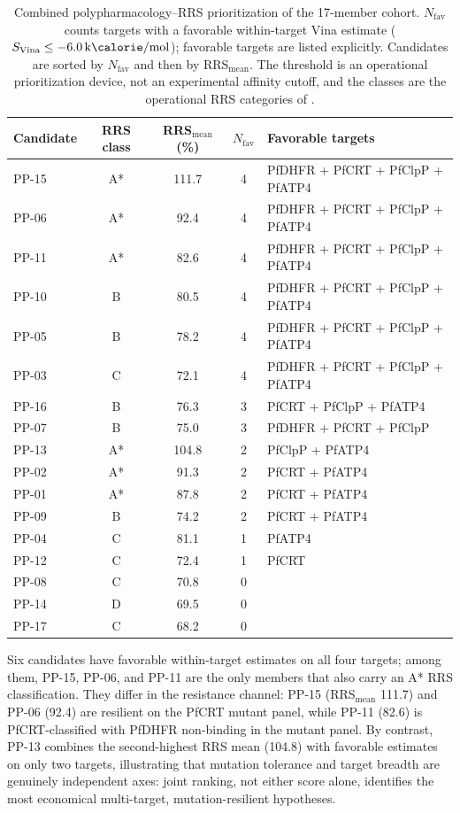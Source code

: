 \documentclass[journal=jcisd8,manuscript=article]{achemso}
\begin{document}
\begin{table}[htbp]
\centering
\caption{Combined polypharmacology--RRS prioritization of the 17-member cohort. $N_{\mathrm{fav}}$ counts targets with a favorable within-target Vina estimate ($S_{\mathrm{Vina}}\leq\qty{-6.0}{\kilo\calorie\per\mole}$); favorable targets are listed explicitly. Candidates are sorted by $N_{\mathrm{fav}}$ and then by RRS$_{\mathrm{mean}}$. The threshold is an operational prioritization device, not an experimental affinity cutoff, and the classes are the operational RRS categories of .}
\label{tab:dual_priority}
\small
\begin{tabular}{@{}lcccl@{}}
\toprule
Candidate & RRS class & RRS$_{\mathrm{mean}}$ (\%) & $N_{\mathrm{fav}}$ & Favorable targets \\
\midrule
PP-15 & A* & \num{111.7} & 4 & PfDHFR + PfCRT + PfClpP + PfATP4 \\
PP-06 & A* & \num{92.4} & 4 & PfDHFR + PfCRT + PfClpP + PfATP4 \\
PP-11 & A* & \num{82.6} & 4 & PfDHFR + PfCRT + PfClpP + PfATP4 \\
PP-10 & B & \num{80.5} & 4 & PfDHFR + PfCRT + PfClpP + PfATP4 \\
PP-05 & B & \num{78.2} & 4 & PfDHFR + PfCRT + PfClpP + PfATP4 \\
PP-03 & C & \num{72.1} & 4 & PfDHFR + PfCRT + PfClpP + PfATP4 \\
PP-16 & B & \num{76.3} & 3 & PfCRT + PfClpP + PfATP4 \\
PP-07 & B & \num{75.0} & 3 & PfDHFR + PfCRT + PfClpP \\
PP-13 & A* & \num{104.8} & 2 & PfClpP + PfATP4 \\
PP-02 & A* & \num{91.3} & 2 & PfCRT + PfATP4 \\
PP-01 & A* & \num{87.8} & 2 & PfCRT + PfATP4 \\
PP-09 & B & \num{74.2} & 2 & PfCRT + PfATP4 \\
PP-04 & C & \num{81.1} & 1 & PfATP4 \\
PP-12 & C & \num{72.4} & 1 & PfCRT \\
PP-08 & C & \num{70.8} & 0 & \textemdash{} \\
PP-14 & D & \num{69.5} & 0 & \textemdash{} \\
PP-17 & C & \num{68.2} & 0 & \textemdash{} \\
\bottomrule
\end{tabular}
\end{table}

Six candidates have favorable within-target estimates on all four targets; among them, PP-15, PP-06, and PP-11 are the only members that also carry an A* RRS classification. They differ in the resistance channel: PP-15 (RRS$_{\mathrm{mean}}$ \num{111.7}) and PP-06 (\num{92.4}) are resilient on the PfCRT mutant panel, while PP-11 (\num{82.6}) is PfCRT-classified with PfDHFR non-binding in the mutant panel. By contrast, PP-13 combines the second-highest RRS mean (\num{104.8}) with favorable estimates on only two targets, illustrating that mutation tolerance and target breadth are genuinely independent axes: joint ranking, not either score alone, identifies the most economical multi-target, mutation-resilient hypotheses.
\end{document}
